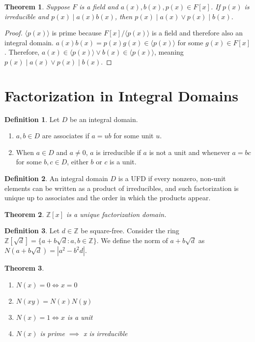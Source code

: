 \documentclass{article}
\theoremstyle{definition}
\newtheorem{definition}{Definition}
\theoremstyle{plain}
\newtheorem{theorem}{Theorem}
\theoremstyle{corollary}
\theoremstyle{lemma}
\begin{document}
\begin{theorem}
    Suppose $F$ is a field and $a(x),b(x),p(x)\in F[x]$. If $p(x)$ is irreducible and $p(x)\mid a(x)b(x)$, then $p(x)\mid a(x)\lor p(x)\mid b(x)$.
\end{theorem}

\begin{proof}
    $\langle p(x)\rangle$ is prime because $F[x]/\langle p(x)\rangle$ is a field and therefore also an integral domain. $a(x)b(x)=p(x)g(x)\in\langle p(x)\rangle$ for some $g(x)\in F[x]$. Therefore, $a(x)\in\langle p(x)\rangle\lor b(x)\in\langle p(x)\rangle$, meaning $p(x)\mid a(x)\lor p(x)\mid b(x)$.
\end{proof}

\section{Factorization in Integral Domains}

\begin{definition}
    Let $D$ be an integral domain.
    \begin{enumerate}
        \item $a,b\in D$ are associates if $a=ub$ for some unit $u$.
        \item When $a\in D$ and $a\neq0$, $a$ is irreducible if $a$ is not a unit and whenever $a=bc$ for some $b,c\in D$, either $b$ or $c$ is a unit.
    \end{enumerate}
\end{definition}

\begin{definition}
    An integral domain $D$ is a UFD if every nonzero, non-unit elements can be written as a product of irreducibles, and such factorization is unique up to associates and the order in which the products appear.
\end{definition}

\begin{theorem}
    $\mathbb{Z}[x]$ is a unique factorization domain.
\end{theorem}

\begin{definition}
    Let $d\in\mathbb{Z}$ be square-free. Consider the ring $\mathbb{Z}[\sqrt d]=\{a+b\sqrt d:a,b\in\mathbb{Z}\}$. We define the norm of $a+b\sqrt d$ as $N(a+b\sqrt d)=|a^2-b^2d|$.
\end{definition}

\begin{theorem}
    \begin{enumerate}
        \item $N(x)=0\iff x=0$
        \item $N(xy)=N(x)N(y)$
        \item $N(x)=1\iff x$ is a unit
        \item $N(x)$ is prime $\implies$ x is irreducible
    \end{enumerate}
\end{theorem}
\end{document}
